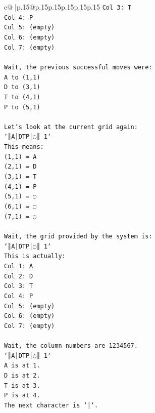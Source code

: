 \documentclass{article}
\begin{document}
{\begin{supertabular}{c@{$\;$}|p{.15\linewidth}@{}p{.15\linewidth}p{.15\linewidth}p{.15\linewidth}p{.15\linewidth}p{.15\linewidth}}
{{{\texttt{Col 3: T} \\
\texttt{Col 4: P} \\
\texttt{Col 5: (empty)} \\
\texttt{Col 6: (empty)} \\
\texttt{Col 7: (empty)} \\
\\ 
\texttt{Wait, the previous successful moves were:} \\
\texttt{A to (1,1)} \\
\texttt{D to (3,1)} \\
\texttt{T to (4,1)} \\
\texttt{P to (5,1)} \\
\\ 
\texttt{Let's look at the current grid again:} \\
\texttt{`║A│DTP│◌║ 1`} \\
\texttt{This means:} \\
\texttt{(1,1) = A} \\
\texttt{(2,1) = D} \\
\texttt{(3,1) = T} \\
\texttt{(4,1) = P} \\
\texttt{(5,1) = ◌} \\
\texttt{(6,1) = ◌} \\
\texttt{(7,1) = ◌} \\
\\ 
\texttt{Wait, the grid provided by the system is:} \\
\texttt{`║A│DTP│◌║ 1`} \\
\texttt{This is actually:} \\
\texttt{Col 1: A} \\
\texttt{Col 2: D} \\
\texttt{Col 3: T} \\
\texttt{Col 4: P} \\
\texttt{Col 5: (empty)} \\
\texttt{Col 6: (empty)} \\
\texttt{Col 7: (empty)} \\
\\ 
\texttt{Wait, the column numbers are 1234567.} \\
\texttt{`║A│DTP│◌║ 1`} \\
\texttt{A is at 1.} \\
\texttt{D is at 2.} \\
\texttt{T is at 3.} \\
\texttt{P is at 4.} \\
\texttt{The next character is `│`.} \\
}}}
\end{supertabular}}
\end{document}
